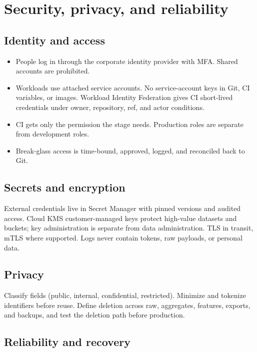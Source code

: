 \documentclass[10pt,a4paper]{article}
\begin{document}
\section{Security, privacy, and reliability}

\subsection{Identity and access}

\begin{itemize}
  \item People log in through the corporate identity provider with MFA.
        Shared accounts are prohibited.
  \item Workloads use attached service accounts. No service-account keys
        in Git, CI variables, or images. Workload Identity Federation
        gives CI short-lived credentials under owner, repository, ref,
        and actor conditions.\cite{gcWIF}
  \item CI gets only the permission the stage needs. Production roles are
        separate from development roles.
  \item Break-glass access is time-bound, approved, logged, and
        reconciled back to Git.
\end{itemize}

\subsection{Secrets and encryption}

External credentials live in Secret Manager with pinned versions and
audited access.\cite{gcSecret} Cloud KMS customer-managed keys protect
high-value datasets and buckets; key administration is separate from
data administration. TLS in transit, mTLS where supported. Logs never
contain tokens, raw payloads, or personal data.

\subsection{Privacy}

Classify fields (public, internal, confidential, restricted). Minimize
and tokenize identifiers before reuse. Define deletion across raw,
aggregates, features, exports, and backups, and test the deletion path
before production.

\subsection{Reliability and recovery}
\end{document}

